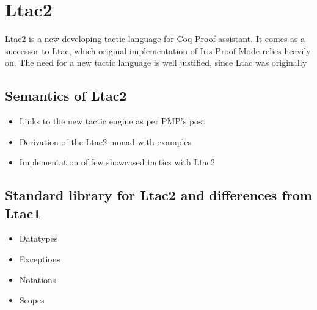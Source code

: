 \chapter{Ltac2}

Ltac2 is a new developing tactic language for Coq Proof assistant.
It comes as a successor to Ltac, which original implementation of Iris Proof Mode relies heavily on.
The need for a new tactic language is well justified, since Ltac was originally 


\section{Semantics of Ltac2}

\begin{itemize}
  \item Links to the new tactic engine as per PMP's post
  \item Derivation of the Ltac2 monad with examples
  \item Implementation of few showcased tactics with Ltac2
\end{itemize}

\section{Standard library for Ltac2 and differences from Ltac1}

\begin{itemize}
  \item Datatypes
  \item Exceptions
  \item Notations
  \item Scopes
\end{itemize}

